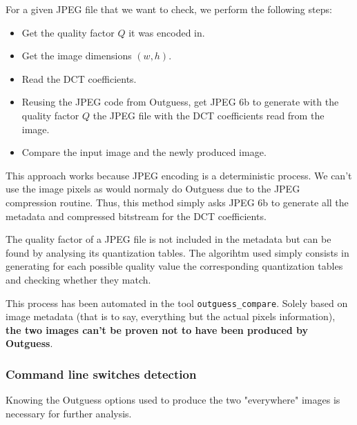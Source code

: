 \documentclass{article}
\begin{document}
For a given JPEG file that we want to check, we perform the following steps:
\begin{itemize}
	\item Get the quality factor $Q$ it was encoded in.
	\item Get the image dimensions $(w, h)$.
	\item Read the DCT coefficients.
	\item Reusing the JPEG code from Outguess, get JPEG 6b to generate with the quality factor $Q$ the JPEG file with the DCT coefficients read from the image.
	\item Compare the input image and the newly produced image.
\end{itemize}

This approach works because JPEG encoding is a deterministic process. We can't use the image pixels as would normaly do Outguess due to the JPEG compression routine. Thus, this method simply asks JPEG 6b to generate all the metadata and compressed bitstream for the DCT coefficients.

The quality factor of a JPEG file is not included in the metadata but can be found by analysing its quantization tables. The algorihtm used simply consists in generating for each possible quality value the corresponding quantization tables and checking whether they match.

This process has been automated in the tool \texttt{outguess\_compare}. Solely based on image metadata (that is to say, everything but the actual pixels information), \textbf{the two images can't be proven not to have been produced by Outguess}.

\subsubsection{Command line switches detection}

Knowing the Outguess options used to produce the two "everywhere" images is necessary for further analysis.
\end{document}
